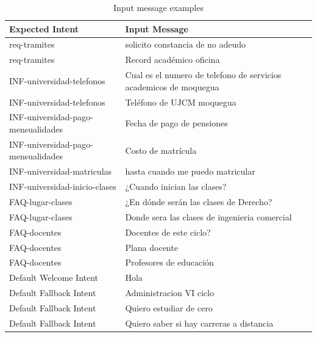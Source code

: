 \documentclass[conference, letterpaper]{IEEEtran}
\begin{document}
\bgroup
\def\arraystretch{1.5}
\begin{table}[hp]
  \centering
  \caption{Input message examples}
  \begin{tabular}{|p{15.285em}|p{18.93em}|}
    \hline
    \textbf{Expected Intent}           & \textbf{Input Message}                                            \\
    \hline
    req-tramites                       & solicito constancia de no adeudo                                  \\
    \hline
    req-tramites                       & Record académico oficina                                          \\
    \hline
    INF-universidad-telefonos          & Cual es el numero de telefono de servicios academicos de moquegua \\
    \hline
    INF-universidad-telefonos          & Teléfono de UJCM moquegua                                         \\
    \hline
    INF-universidad-pago-mensualidades & Fecha de pago de pensiones                                        \\
    \hline
    INF-universidad-pago-mensualidades & Costo de matrícula                                                \\
    \hline
    INF-universidad-matriculas         & hasta cuando me puedo matricular                                  \\
    \hline
    INF-universidad-inicio-clases      & ¿Cuando inician las clases?                                       \\
    \hline
    FAQ-lugar-clases                   & ¿En dónde serán las clases de Derecho?                            \\
    \hline
    FAQ-lugar-clases                   & Donde sera las clases de ingenieria comercial                     \\
    \hline
    FAQ-docentes                       & Docentes de este ciclo?                                           \\
    \hline
    FAQ-docentes                       & Plana docente                                                     \\
    \hline
    FAQ-docentes                       & Profesores de educación                                           \\
    \hline
    Default Welcome Intent             & Hola                                                              \\
    \hline
    Default Fallback Intent            & Administracion VI ciclo                                           \\
    \hline
    Default Fallback Intent            & Quiero estudiar de cero                                           \\
    \hline
    Default Fallback Intent            & Quiero saber si hay carreras a distancia                          \\
    \hline
  \end{tabular}%
  \label{tab:inputMessagesExamples}%
\end{table}
\egroup
\end{document}

